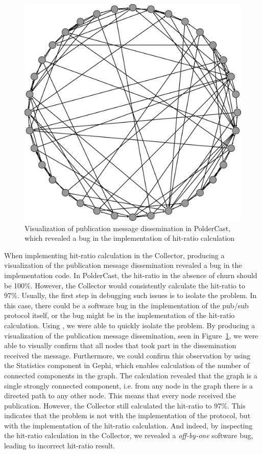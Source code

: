 \begin{figure}[ht!]
    \centering
    \includegraphics[width=\linewidth]{figures/hitratiobug}
    \caption{Visualization of publication message dissemination in
        PolderCast, which revealed a bug in the implementation of hit-ratio
        calculation}
    \label{fig:hitratiobug}
\end{figure}

When implementing hit-ratio calculation in the Collector, producing a
visualization of the publication message dissemination revealed a bug in the implementation code.
In PolderCast, the hit-ratio in the absence of churn should be 100\%.
However, the Collector would consistently calculate the hit-ratio to
97\%. Usually, the first step in debugging such issues is to isolate the
problem. In this case, there could be a software bug in the
implementation of the pub/sub protocol itself, or the bug might be in
the implementation of the hit-ratio calculation. Using \demo, we were
able to quickly isolate the problem. By producing a visualization of the
publication message dissemination, seen in Figure~\ref{fig:hitratiobug},
we were able to visually confirm that all nodes that took part in the dissemination
received the message. Furthermore, we could confirm this observation by
using the Statistics component in Gephi, which enables calculation of
the number of connected components in the graph.  The calculation
revealed that the graph is a single strongly connected component, i.e.
from any node in the graph there is a directed path to any other node.
This means that every node received the publication.  However, the
Collector still calculated the hit-ratio to 97\%. This indicates that
the problem is not with the implementation of the protocol, but with the
implementation of the hit-ratio calculation. And indeed, by inspecting
the hit-ratio calculation in the Collector, we revealed a
\emph{off-by-one} software bug, leading to incorrect hit-ratio result.

